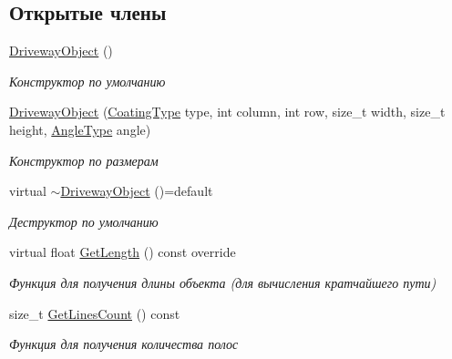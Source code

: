 \subsection*{Открытые члены}
\begin{DoxyCompactItemize}
\item 
\mbox{\label{classrtm_1_1_driveway_object_a0db985799ef0297057c2e33284418a6b}} 
\hyperlink{classrtm_1_1_driveway_object_a0db985799ef0297057c2e33284418a6b}{Driveway\+Object} ()
\begin{DoxyCompactList}\small\item\em Конструктор по умолчанию \end{DoxyCompactList}\item 
\hyperlink{classrtm_1_1_driveway_object_aa9f5531382b6be2c6fb0cde4160a9f90}{Driveway\+Object} (\hyperlink{namespacertm_aecd3929e64cd461eb3555b611f6fad95}{Coating\+Type} type, int column, int row, size\+\_\+t width, size\+\_\+t height, \hyperlink{namespacertm_a69dc82b16a0148c10962caa83d930f89}{Angle\+Type} angle)
\begin{DoxyCompactList}\small\item\em Конструктор по размерам \end{DoxyCompactList}\item 
\mbox{\label{classrtm_1_1_driveway_object_a822b655b5c429ce2775a3999f77265a0}} 
virtual \hyperlink{classrtm_1_1_driveway_object_a822b655b5c429ce2775a3999f77265a0}{$\sim$\+Driveway\+Object} ()=default
\begin{DoxyCompactList}\small\item\em Деструктор по умолчанию \end{DoxyCompactList}\item 
virtual float \hyperlink{classrtm_1_1_driveway_object_a5de41ef395ad8ccefb435e568f84ed40}{Get\+Length} () const override
\begin{DoxyCompactList}\small\item\em Функция для получения длины объекта (для вычисления кратчайшего пути) \end{DoxyCompactList}\item 
size\+\_\+t \hyperlink{classrtm_1_1_driveway_object_a239d7f4d9d5203d1f00cf60294e94151}{Get\+Lines\+Count} () const
\begin{DoxyCompactList}\small\item\em Функция для получения количества полос \end{DoxyCompactList}\item 

\end{DoxyCompactItemize}
